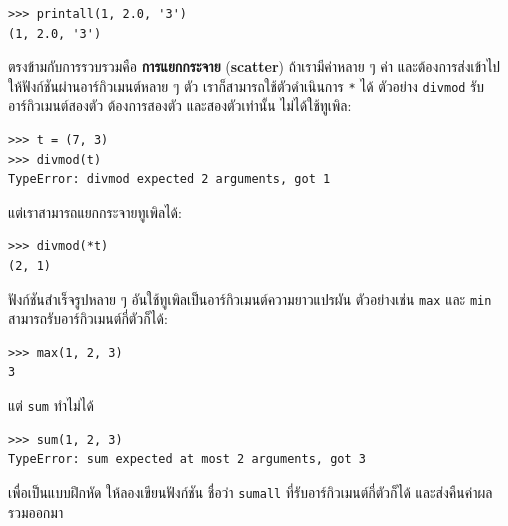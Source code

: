 \begin{verbatim}
>>> printall(1, 2.0, '3')
(1, 2.0, '3')
\end{verbatim}
%
%
ตรงข้ามกับการรวบรวมคือ \textbf{การแยกกระจาย} (\textbf{scatter})
ถ้าเรามีค่าหลาย ๆ ค่า และต้องการส่งเข้าไปให้ฟังก์ชันผ่านอาร์กิวเมนต์หลาย ๆ ตัว
เราก็สามารถใช้ตัวดำเนินการ \texttt{*} ได้
ตัวอย่าง \texttt{divmod} รับอาร์กิวเมนต์สองตัว ต้องการสองตัว และสองตัวเท่านั้น
ไม่ได้ใช้ทูเพิล:
%


\begin{verbatim}
>>> t = (7, 3)
>>> divmod(t)
TypeError: divmod expected 2 arguments, got 1
\end{verbatim}
%
%
แต่เราสามารถแยกกระจายทูเพิลได้:

\begin{verbatim}
>>> divmod(*t)
(2, 1)
\end{verbatim}
%
%
ฟังก์ชันสำเร็จรูปหลาย ๆ อันใช้ทูเพิลเป็นอาร์กิวเมนต์ความยาวแปรผัน
ตัวอย่างเช่น \texttt{max} และ \texttt{min} สามารถรับอาร์กิวเมนต์กี่ตัวก็ได้:


\begin{verbatim}
>>> max(1, 2, 3)
3
\end{verbatim}
%
แต่ \texttt{sum} ทำไม่ได้

\begin{verbatim}
>>> sum(1, 2, 3)
TypeError: sum expected at most 2 arguments, got 3
\end{verbatim}
%
เพื่อเป็นแบบฝึกหัด ให้ลองเขียนฟังก์ชัน ชื่อว่า \texttt{sumall} ที่รับอาร์กิวเมนต์กี่ตัวก็ได้ และส่งคืนค่าผลรวมออกมา

